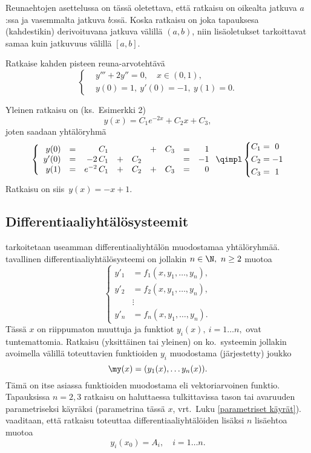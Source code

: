 Reunaehtojen asettelussa on tässä oletettava, että ratkaisu on oikealta jatkuva $a$:ssa ja
vasemmalta jatkuva $b$:ssä. Koska ratkaisu on joka tapauksesa (kahdestikin) derivoituvana
jatkuva välillä $(a,b)$, niin lisäoletukset tarkoittavat samaa kuin jatkuvuus välillä $[a,b]$.
\begin{Exa}
Ratkaise kahden pisteen reuna-arvotehtävä
\[
\left\{ \begin{aligned}
&y'''+2y''=0,\quad x\in (0,1), \\
&y(0)=1, \ y'(0)=-1, \ y(1)=0.
\end{aligned} \right.
\]
\end{Exa}
\ratk Yleinen ratkaisu on (ks.\ Esimerkki 2)
\[
y(x)=C_1e^{-2x}+C_2x+C_3,
\]
joten saadaan yhtälöryhmä
\[ \left\{ \begin{array}{rrrrrrrrr}  y(0)&=&        C_1& &   &+&C_3&=& 1 \\
                                    y'(0)&=&    -2\,C_1&+&C_2& &   &=&-1 \\
                                     y(1)&=&e^{-2}\,C_1&+&C_2&+&C_3&=& 0
\end{array} \right. 
   \qimpl \left\{ \begin{aligned} C_1&=\ 0 \\ C_2&=-1 \\ C_3&=\ 1 \end{aligned} \right. \] 
Ratkaisu on siis $\,y(x)=-x+1$. \loppu 

\subsection*{Differentiaaliyhtälösysteemit}

 tarkoitetaan useamman differentiaaliyhtälön muodostamaa
yhtälöryhmää. 
 tavallinen differentiaaliyhtälösysteemi on jollakin
$n\in\N,\ n \ge 2$ muotoa
\[
 \left\{ \begin{aligned} 
         y'_1 &= f_1(x,y_1, \ldots, y_n), \\
         y'_2 &= f_2(x,y_1, \ldots, y_n), \\
              &\vdots \\
         y'_n &= f_n(x,y_1, \ldots, y_n).
         \end{aligned} \right.
\]
Tässä $x$ on riippumaton muuttuja ja funktiot $y_i(x),\ i=1 \ldots n,$ ovat tuntemattomia.
Ratkaisu (yksittäinen tai yleinen) on ko.\ systeemin jollakin avoimella välillä toteuttavien
funktioiden $y_i$ muodostama (järjestetty) joukko
\[
\my(x)=(y_1(x), \ldots y_n(x)).
\]
Tämä on itse asiassa funktioiden muodostama  eli vektoriarvoinen funktio.
Tapauksissa $n=2,3$ ratkaisu on haluttaessa tulkittavissa tason tai avaruuden parametriseksi 
käyräksi (parametrina tässä $x$, vrt.\ Luku \ref{parametriset käyrät}).
%
 vaaditaan, että ratkaisu toteuttaa differentiaaliyhtälöiden lisäksi
$n$ lisäehtoa muotoa
\[ 
y_i(x_0) = A_i, \quad i = 1 \ldots n.
\]

